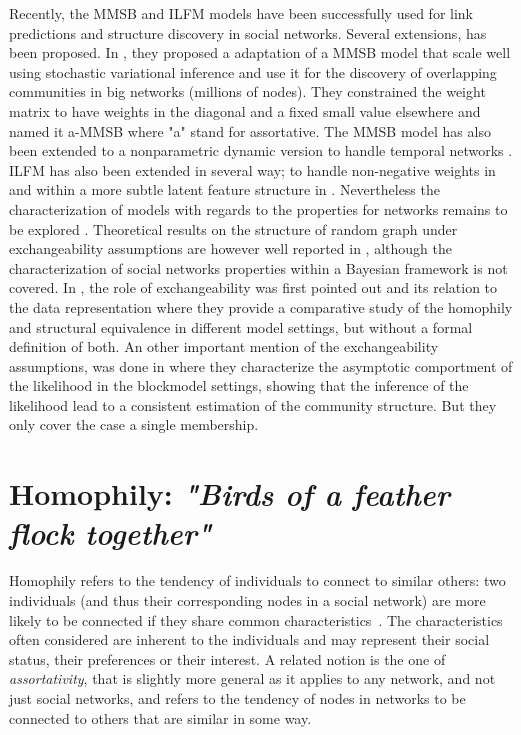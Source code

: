 \documentclass{llncs}
\begin{document}


Recently, the MMSB \cite{MMSB} and ILFM \cite{ILFRM} models have been successfully used for link predictions and structure discovery in social networks. Several extensions, has been proposed. In \cite{AMMSB}, they proposed a adaptation of a MMSB model that scale well using stochastic variational inference and use it for the discovery of overlapping communities in big networks (millions of nodes). They constrained the weight matrix to have weights in the diagonal and a fixed small value elsewhere and named it a-MMSB where "a" stand for assortative. The MMSB model has also been extended to a nonparametric dynamic version to handle temporal networks \cite{fan2015dynamic}. ILFM has also been extended in several way; to handle non-negative weights in \cite{IMRM} and within a more subtle latent feature structure in \cite{ILAM}. Nevertheless the characterization of models with regards to the properties for networks remains to be explored \cite{jacobs2014unified}. Theoretical results on the structure of random graph under exchangeability assumptions are however well reported in \cite{orbanz2015bayesian}, although the characterization of social networks properties within a Bayesian framework is not covered. In \cite{hoff2008modeling}, the role of exchangeability was first pointed out and its relation to the data representation where they provide a comparative study of the homophily and structural equivalence in different model settings, but without a formal definition of both. An other important mention of the exchangeability assumptions, was done in \cite{bickel2009nonparametric} where they characterize the asymptotic comportment of the likelihood in the blockmodel settings, showing that the inference of the likelihood lead to a consistent estimation of the community structure. But they only cover the case a single membership.


\section{Homophily: \emph{"Birds of a feather flock together"}}
\label{sec:homophily}

Homophily refers to the tendency of individuals to connect to similar others: two individuals (and thus their corresponding nodes in a social network) are more likely to be connected if they share common characteristics~\cite{mcpherson2001birds,lazarsfeld1954friendship}. The characteristics often considered are inherent to the individuals and may represent their social status, their preferences or their interest. A related notion is the one of {\it assortativity}, that is slightly more general as it applies to any network, and not just social networks, and refers to the tendency of nodes in networks to be connected to others that are similar in some way.
\end{document}
